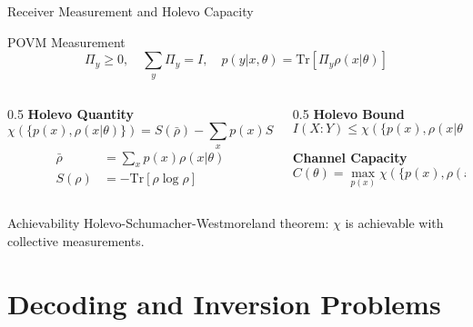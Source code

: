 \documentclass[10pt]{beamer}
\begin{document}
\begin{frame}{Receiver Measurement and Holevo Capacity}
\begin{block}{POVM Measurement}
\begin{equation*}
\Pi_y \geq 0, \quad \sum_y \Pi_y = I, \quad p(y|x,\theta) = \text{Tr}[\Pi_y \rho(x|\theta)]
\end{equation*}
\end{block}

\begin{columns}
\begin{column}{0.5\textwidth}
\textbf{Holevo Quantity}
\begin{equation*}
\chi(\{p(x), \rho(x|\theta)\}) = S(\bar{\rho}) - \sum_x p(x)S(\rho(x|\theta))
\end{equation*}
\begin{align*}
\bar{\rho} &= \sum_x p(x)\rho(x|\theta) \\
S(\rho) &= -\text{Tr}[\rho\log\rho]
\end{align*}
\end{column}

\begin{column}{0.5\textwidth}
\textbf{Holevo Bound}
\begin{equation*}
I(X:Y) \leq \chi(\{p(x), \rho(x|\theta)\})
\end{equation*}

\textbf{Channel Capacity}
\begin{equation*}
C(\theta) = \max_{p(x)} \chi(\{p(x), \rho(x|\theta)\})
\end{equation*}
\end{column}
\end{columns}

\begin{block}{Achievability}
Holevo-Schumacher-Westmoreland theorem: $\chi$ is achievable with collective measurements.
\end{block}
\end{frame}

\section{Decoding and Inversion Problems}
\end{document}

